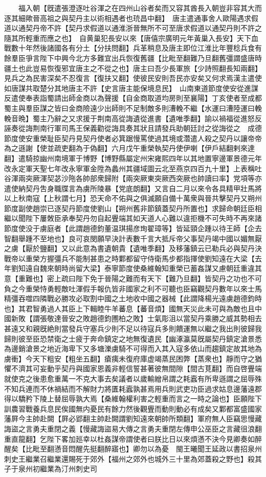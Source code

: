　　福入朝【旣遣張澄逐吐谷渾之在四州山谷者矣而又容其酋長入朝豈非容其大而逐其細歟晉高祖之與契丹主以術相遇者也珫昌中翻】　唐主遣通事舍人歐陽遇求假道以通契丹帝不許【契丹求假道以通淮浙晉無所不可至唐求假道以通契丹則不許之隨其所輕重而應之也】　自黄巢犯長安以來【唐僖宗廣明元年黃巢入長安】天下血戰數十年然後諸國各有分土【分扶問翻】兵革稍息及唐主即位江淮比年豐稔兵食有餘羣臣爭言陛下中興今北方多難宜出兵恢復舊疆【比毗至翻難乃旦翻舊彊謂盛唐時疆土也此豈易恢復邪宜唐主之不從之也】唐主曰吾少長軍旅【少詩照翻長知兩翻】見兵之為民害深矣不忍復言【復扶又翻】使彼民安則吾民亦安矣又何求焉漢主遣使如唐謀共取楚分其地唐主不許【史言唐主能保境息民】　山南東道節度使安從進謀反遣使奉表詣蜀請出師金商以為聲援【自金商取道均房則至襄陽】丁亥使者至成都蜀主與羣臣謀之皆曰金商險遠少出師則不足制敵多則漕輓不繼【水運曰漕陸運曰輓輓音晩】蜀主乃辭之又求援于荆南高從誨遺從進書【遺唯季翻】諭以禍福從進怒反誣奏從誨荆南行軍司馬王保義勸從誨具奏其狀且請發兵助朝廷討之從誨從之　成德節度使安重榮耻臣契丹見契丹使者必箕踞慢罵使過其境或濳遣人殺之契丹以讓帝帝為之遜謝【使並疏吏翻為于偽翻】六月戊午重榮執契丹使伊喇【伊戶結翻剌來達翻】遣騎掠幽州南境軍于博野【博野縣屬定州宋雍熙四年以其地置寧邊軍景德元年改永定軍天聖七年改永寧軍金陞為蠡州其疆域圖云北至燕京四百九十里】上表稱吐谷渾兩突厥渾契苾沙陁各帥部衆歸附【兩突厥東突厥西突厥也帥讀曰率】党項等亦遣使納契丹吿身職牒言為虜所陵暴【党底朗翻】又言自二月以來令各具精甲壯馬將以上秋南寇【上秋謂七月】恐天命不佑與之俱滅願自備十萬衆與晉共擊契丹又朔州節度副使趙崇已逐契丹節度使劉山【朔州舊非節鎮蓋契丹所置也】求歸命朝廷臣相繼以聞陛下屢敇臣承奉契丹勿自起舋端其如天道人心難以違拒機不可失時不再來諸節度使没于虜庭者【此謂趙德鈞董温琪揚彦珣翟璋等】皆延頸企踵以待王師【企去智翻舉踵不至地也】良可哀閔願早決計表數千言大抵斥帝父事契丹竭中國以媚無厭之虜【厭於鹽翻】又以此意為書遺朝貴【遺唯季翻】及移藩鎮云已勒兵必與契丹決戰帝以重榮方握彊兵不能制甚患之時鄴都留守侍衛馬步都指揮使劉知遠在大梁【去年劉知遠自魏來朝時尚留大梁】泰寧節度使桑維翰知重榮已蓄姦謀又慮朝廷重違其意【重難也】密上疏曰陛下免于晉陽之難而有天下【難乃旦翻】皆契丹之功也不可負之今重榮恃勇輕敵吐渾假手報仇皆非國家之利不可聽也臣竊觀契丹數年以來士馬精彊吞噬四隣戰必勝攻必取割中國之土地收中國之器械【此謂降楊光遠虜趙德鈞時也】其君智勇過人其臣上下輯睦牛羊蕃息【蕃音煩】國無天災此未可與為敵也且中國新敗【謂張敬達晉安之敗趙德鈞圑柏之敗】士氣彫沮以當契丹乘勝之威其勢相去甚遠又和親旣絶則當發兵守塞兵少則不足以待寇兵多則饋運無以繼之我出則彼歸我歸則彼至臣恐禁衛之士疲于奔命鎮定之地無復遺民【幽涿瀛莫旣屬契丹鎮定滄景悉為邊銷滄景之地近海卑下又多塘濼虜騎不可得而入其入寇多依山而趨鎮定故其地為虜衝】今天下粗安【粗坐五翻】瘡痍未復府庫虚竭蒸民困弊【蒸衆也】靜而守之猶懼不濟其可妄動乎契丹與國家恩義非輕信誓甚著彼無間隙【間古莧翻】而自啓舋端就使克之後患愈重萬一不克大事去矣議者以歲輸繒帛謂之耗蠧有所卑遜謂之屈辱殊不知兵連而不休禍結而不解財力將匱耗蠧孰甚焉用兵則武吏功臣過求姑息邊藩遠郡得以驕矜下陵上替屈辱孰大焉【桑維翰權利害之輕重而言之一時之論也】臣願陛下訓農習戰養兵息民俟國無内憂民有餘力然後觀舋而動則動必有成矣又鄴都富盛國家藩屛今主帥赴闕【屛必郢翻主帥赴闕謂劉知遠來朝帥所類翻】軍府無人臣竊思慢藏誨盜之言勇夫重閉之義【慢藏誨盜易大傳之言勇夫重閉左傳申公巫臣之言藏徂浪翻重直龍翻】乞陛下畧加廵幸以杜姦謀帝謂使者曰朕比日以來煩懣不決今見卿奏如醉醒矣【比毗至翻懣音悶醒先挺翻醉寤也】卿勿以為憂　閩王曦聞王延政以書招泉州刺史王繼業召繼業還賜死于郊外【福州之郊外也城外三十里為郊蓋殺之野也】殺其子于泉州初繼業為汀州刺史司